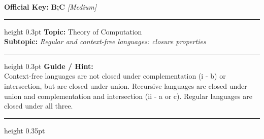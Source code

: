 \documentclass[a4paper,10pt]{article}
\begin{document}
\begin{tcolorbox}
\textbf{Official Key:} \textbf{\large B;C} \hfill \textit{\small [Medium]}
\vspace{2pt}\hrule height 0.3pt\vspace{3pt}
\textbf{Topic:} Theory of Computation \\
\textbf{Subtopic:} \textit{Regular and context-free languages: closure properties}
\vspace{2pt}\hrule height 0.3pt\vspace{3pt}
\textbf{Guide / Hint:} \\
{\small Context-free languages are not closed under complementation (i - b) or intersection, but are closed under union. Recursive languages are closed under union and complementation and intersection (ii - a or c). Regular languages are closed under all three.}

\end{tcolorbox}
\vspace{6pt}\hrule height 0.35pt\vspace{6pt}
\noindent
\end{document}
